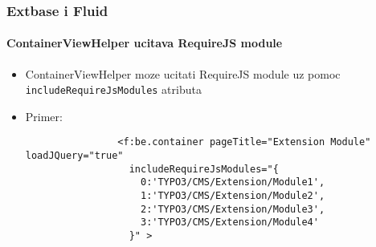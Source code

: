 
\begin{frame}[fragile]
	\frametitle{Extbase i Fluid}
	\framesubtitle{ContainerViewHelper ucitava RequireJS module}

	\begin{itemize}

		\item ContainerViewHelper moze ucitati RequireJS module uz pomoc \texttt{includeRequireJsModules} atributa

		\item Primer:

			\begin{lstlisting}
				<f:be.container pageTitle="Extension Module" loadJQuery="true"
				  includeRequireJsModules="{
				    0:'TYPO3/CMS/Extension/Module1',
				    1:'TYPO3/CMS/Extension/Module2',
				    2:'TYPO3/CMS/Extension/Module3',
				    3:'TYPO3/CMS/Extension/Module4'
				  }" >
			\end{lstlisting}

	\end{itemize}

\end{frame}


